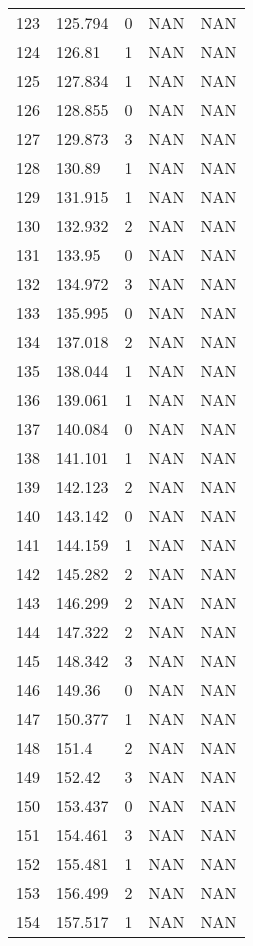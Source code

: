 \documentclass{article}
\begin{document}
\begin{longtable}{@{}lllll@{}}
				123 & 125.794 & 0    & NAN  & NAN  \\
				124 & 126.81  & 1    & NAN  & NAN  \\
				125 & 127.834 & 1    & NAN  & NAN  \\
				126 & 128.855 & 0    & NAN  & NAN  \\
				127 & 129.873 & 3    & NAN  & NAN  \\
				128 & 130.89  & 1    & NAN  & NAN  \\
				129 & 131.915 & 1    & NAN  & NAN  \\
				130 & 132.932 & 2    & NAN  & NAN  \\
				131 & 133.95  & 0    & NAN  & NAN  \\
				132 & 134.972 & 3    & NAN  & NAN  \\
				133 & 135.995 & 0    & NAN  & NAN  \\
				134 & 137.018 & 2    & NAN  & NAN  \\
				135 & 138.044 & 1    & NAN  & NAN  \\
				136 & 139.061 & 1    & NAN  & NAN  \\
				137 & 140.084 & 0    & NAN  & NAN  \\
				138 & 141.101 & 1    & NAN  & NAN  \\
				139 & 142.123 & 2    & NAN  & NAN  \\
				140 & 143.142 & 0    & NAN  & NAN  \\
				141 & 144.159 & 1    & NAN  & NAN  \\
				142 & 145.282 & 2    & NAN  & NAN  \\
				143 & 146.299 & 2    & NAN  & NAN  \\
				144 & 147.322 & 2    & NAN  & NAN  \\
				145 & 148.342 & 3    & NAN  & NAN  \\
				146 & 149.36  & 0    & NAN  & NAN  \\
				147 & 150.377 & 1    & NAN  & NAN  \\
				148 & 151.4   & 2    & NAN  & NAN  \\
				149 & 152.42  & 3    & NAN  & NAN  \\
				150 & 153.437 & 0    & NAN  & NAN  \\
				151 & 154.461 & 3    & NAN  & NAN  \\
				152 & 155.481 & 1    & NAN  & NAN  \\
				153 & 156.499 & 2    & NAN  & NAN  \\
				154 & 157.517 & 1    & NAN  & NAN  \\

\end{longtable}
\end{document}
